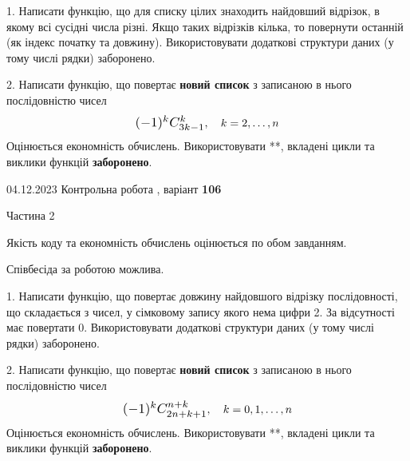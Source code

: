 \documentclass[12pt, ukrainian]{article}
\begin{document}
{{{{{\begin {Large}
1. Написати функцію, що для списку цілих знаходить найдовший відрізок, в якому всі сусідні числа різні. Якщо таких відрізків кілька, то повернути останній (як індекс початку та довжину). Використовувати додаткові структури даних (у тому числі рядки) заборонено.

\vspace{10mm}



2. 
Написати функцію, що повертає \textbf{новий список} з записаною в нього послідовністю чисел
$$\scalebox{1.2}{$(-1)^{k}C_{3k-1}^{k}$}, \quad k=2,\ldots,n$$
Оцінюється економність обчислень. Використовувати **, вкладені цикли та виклики функцій \textbf{заборонено}.

\end{Large}\newpage




\begin {Huge}
{{04.12.2023 Контрольна робота , варіант  \No \textbf { 106 }\par}}

\begin{center}Частина 2
\end{center}
\vspace{10mm}
\end {Huge}

{
\begin {Large}
Якість коду та економність обчислень оцінюється по обом завданням.

Співбесіда за роботою можлива.

\vspace{5mm}

1. Написати функцію, що повертає довжину найдовшого відрізку послідовності, що складається з чисел, у сімковому запису якого нема цифри 2. За відсутності має повертати $0$. Використовувати додаткові структури даних (у тому числі рядки) заборонено.

\vspace{10mm}



2. 
Написати функцію, що повертає \textbf{новий список} з записаною в нього послідовністю чисел
$$\scalebox{1.2}{$(-1)^{k}C_{2n+k+1}^{n+k}$}, \quad k=0,1,\ldots,n$$
Оцінюється економність обчислень. Використовувати **, вкладені цикли та виклики функцій \textbf{заборонено}.

\end{Large}\newpage

}}}}}}
\end{document}
